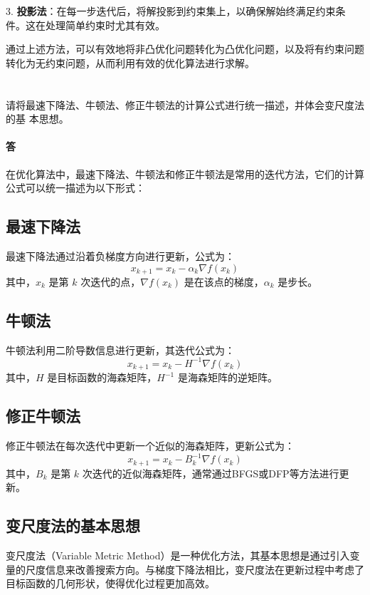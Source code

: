\documentclass[a4paper]{article}
\begin{document}
3. \textbf{投影法}：在每一步迭代后，将解投影到约束集上，以确保解始终满足约束条件。这在处理简单约束时尤其有效。

通过上述方法，可以有效地将非凸优化问题转化为凸优化问题，以及将有约束问题转化为无约束问题，从而利用有效的优化算法进行求解。

\section{}

请将最速下降法、牛顿法、修正牛顿法的计算公式进行统一描述，并体会变尺度法的基
本思想。 

\paragraph{答}

在优化算法中，最速下降法、牛顿法和修正牛顿法是常用的迭代方法，它们的计算公式可以统一描述为以下形式：

\subsection{最速下降法}

最速下降法通过沿着负梯度方向进行更新，公式为：
\[
x_{k+1} = x_k - \alpha_k \nabla f(x_k)
\]
其中，$x_k$ 是第 $k$ 次迭代的点，$\nabla f(x_k)$ 是在该点的梯度，$\alpha_k$ 是步长。

\subsection{牛顿法}

牛顿法利用二阶导数信息进行更新，其迭代公式为：
\[
x_{k+1} = x_k - H^{-1} \nabla f(x_k)
\]
其中，$H$ 是目标函数的海森矩阵，$H^{-1}$ 是海森矩阵的逆矩阵。

\subsection{修正牛顿法}

修正牛顿法在每次迭代中更新一个近似的海森矩阵，更新公式为：
\[
x_{k+1} = x_k - B_k^{-1} \nabla f(x_k)
\]
其中，$B_k$ 是第 $k$ 次迭代的近似海森矩阵，通常通过BFGS或DFP等方法进行更新。

\subsection{变尺度法的基本思想}

变尺度法（Variable Metric Method）是一种优化方法，其基本思想是通过引入变量的尺度信息来改善搜索方向。与梯度下降法相比，变尺度法在更新过程中考虑了目标函数的几何形状，使得优化过程更加高效。
\end{document}
